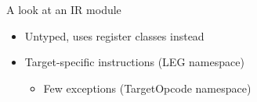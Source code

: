 
\begin{frame}{A look at an IR module}

\begin{itemize}
    \item Untyped, uses register classes instead
    \item Target-specific instructions (LEG namespace)
    \begin{itemize}
        \item Few exceptions (TargetOpcode namespace)
    \end{itemize}
\end{itemize}


\end{frame}
